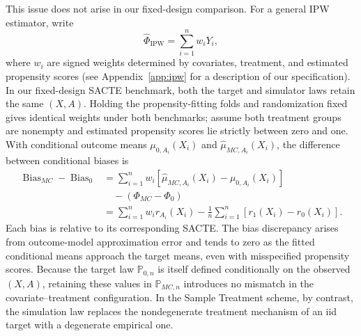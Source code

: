 This issue does not arise in our fixed-design comparison. For a general IPW estimator, write
\[
\widehat\Phi_{\mathrm{IPW}}=\sum_{i=1}^n w_iY_i,
\]
where \(w_i\) are signed weights determined by covariates, treatment, and estimated propensity scores (see Appendix~\ref{app:ipw} for a description of our specification). In our fixed-design SACTE benchmark, both the target and simulator laws retain the same \((X,A)\). Holding the propensity-fitting folds and randomization fixed gives identical weights under both benchmarks; assume both treatment groups are nonempty and estimated propensity scores lie strictly between zero and one. With conditional outcome means \(\mu_{0,A_i}(X_i)\) and \(\widehat\mu_{MC,A_i}(X_i)\), the difference between conditional biases is
\[
\begin{aligned}
\operatorname{Bias}_{MC}-\operatorname{Bias}_0
&=\sum_{i=1}^n w_i[\widehat\mu_{MC,A_i}(X_i)-\mu_{0,A_i}(X_i)]\\
&\quad-(\Phi_{MC}-\Phi_0)\\
&=\sum_{i=1}^n w_i r_{A_i}(X_i)
-\frac1n\sum_{i=1}^n[r_1(X_i)-r_0(X_i)].
\end{aligned}
\]
Each bias is relative to its corresponding SACTE. The bias discrepancy arises from outcome-model approximation error and tends to zero as the fitted conditional means approach the target means, even with misspecified propensity scores. Because the target law \(\mathbb P_{0,n}\) is itself defined conditionally on the observed \((X,A)\), retaining these values in \(\mathbb P_{MC,n}\) introduces no mismatch in the covariate--treatment configuration. In the Sample Treatment scheme, by contrast, the simulation law replaces the nondegenerate treatment mechanism of an iid target with a degenerate empirical one.
